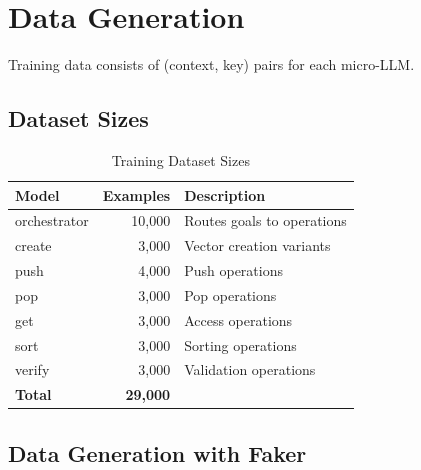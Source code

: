 \documentclass[11pt,a4paper]{article}
\begin{document}
\section{Data Generation}

Training data consists of (context, key) pairs for each micro-LLM.

\subsection{Dataset Sizes}

\begin{table}[h]
\centering
\begin{tabular}{lrl}
\toprule
\textbf{Model} & \textbf{Examples} & \textbf{Description} \\
\midrule
orchestrator & 10,000 & Routes goals to operations \\
create & 3,000 & Vector creation variants \\
push & 4,000 & Push operations \\
pop & 3,000 & Pop operations \\
get & 3,000 & Access operations \\
sort & 3,000 & Sorting operations \\
verify & 3,000 & Validation operations \\
\midrule
\textbf{Total} & \textbf{29,000} & \\
\bottomrule
\end{tabular}
\caption{Training Dataset Sizes}
\end{table}

\subsection{Data Generation with Faker}
\end{document}
